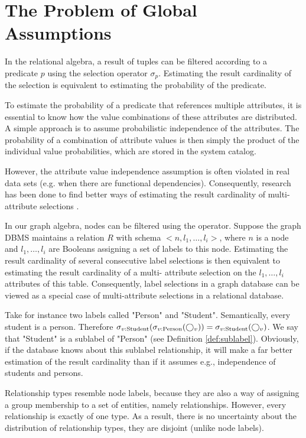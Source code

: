 \section{The Problem of Global Assumptions}

In the relational algebra, a result of tuples can be filtered according to a
predicate $p$ using the selection operator $\sigma_p$.
Estimating the result cardinality of the selection is equivalent to estimating
the probability of the predicate.

To estimate the probability of a predicate that references multiple attributes,
it is essential to know how the value combinations of these attributes are distributed.
A simple approach is to assume probabilistic independence of the attributes.
The probability of a combination of attribute values is then simply the product
of the individual value probabilities, which are stored in the system catalog.

However, the attribute value independence assumption is often violated in real
data sets (e.g. when there are functional dependencies).
Consequently, research has been done to find better ways of estimating the result
cardinality of multi-attribute selections \cite{poosala_selectivity_1997}.

In our graph algebra, nodes can be filtered using the 
operator.
Suppose the graph DBMS maintains a relation $R$ with schema
$<n, l_1, \ldots, l_i>$, where $n$ is a node and $l_1, \ldots, l_i$ are
Booleans assigning a set of labels to this node.
Estimating the result cardinality of several consecutive label
selections is then equivalent to estimating the result cardinality of a multi-
attribute selection on the $l_1, \ldots, l_i$ attributes of this table.
Consequently, label selections in a graph database can be viewed as a special
case of multi-attribute selections in a relational database.

Take for instance two labels called "Person" and "Student".
Semantically, every student is a person. Therefore
$\sigma_{v:\text{Student}}(\sigma_{v:\text{Person}}(\bigcirc_{v}))
  = \sigma_{v:\text{Student}}(\bigcirc_{v})$.
We say that "Student" is a sublabel of "Person" (see Definition
\ref{def:sublabel}).
Obviously, if the database knows about this sublabel relationship, it will make
a far better estimation of the result cardinality than if it assumes e.g.,
independence of students and persons.

\begin{remark}
Relationship types resemble node labels, because they
are also a way of assigning a group membership to a set of entities,
namely relationships.
However, every relationship is exactly of one type. As a result, there is no
uncertainty about the distribution of relationship types, they are disjoint
(unlike node labels).
\end{remark}

